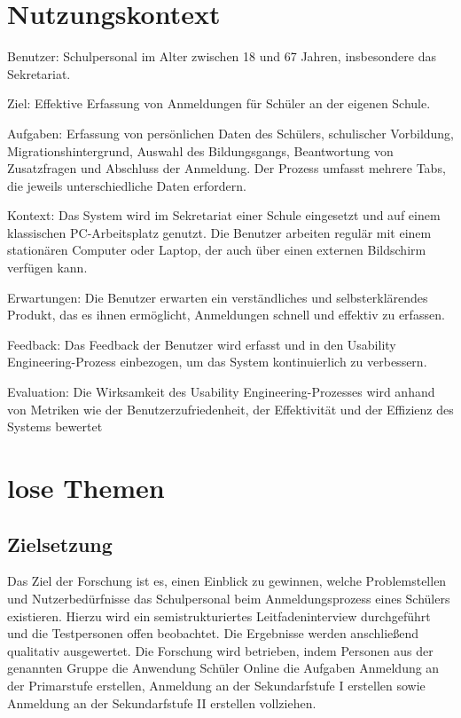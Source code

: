 
\section{Nutzungskontext}
Benutzer: Schulpersonal im Alter zwischen 18 und 67 Jahren, insbesondere das Sekretariat.

Ziel: Effektive Erfassung von Anmeldungen für Schüler an der eigenen Schule.

Aufgaben: Erfassung von persönlichen Daten des Schülers, schulischer Vorbildung, Migrationshintergrund, Auswahl des Bildungsgangs, Beantwortung von Zusatzfragen und Abschluss der Anmeldung. Der Prozess umfasst mehrere Tabs, die jeweils unterschiedliche Daten erfordern.

Kontext: Das System wird im Sekretariat einer Schule eingesetzt und auf einem klassischen PC-Arbeitsplatz genutzt. Die Benutzer arbeiten regulär mit einem stationären Computer oder Laptop, der auch über einen externen Bildschirm verfügen kann.

Erwartungen: Die Benutzer erwarten ein verständliches und selbsterklärendes Produkt, das es ihnen ermöglicht, Anmeldungen schnell und effektiv zu erfassen.

Feedback: Das Feedback der Benutzer wird erfasst und in den Usability Engineering-Prozess einbezogen, um das System kontinuierlich zu verbessern.

Evaluation: Die Wirksamkeit des Usability Engineering-Prozesses wird anhand von Metriken wie der Benutzerzufriedenheit, der Effektivität und der Effizienz des Systems bewertet

\section{lose Themen}
\subsection{Zielsetzung}
Das Ziel der Forschung ist es, einen Einblick zu gewinnen, welche Problemstellen und Nutzerbedürfnisse das Schulpersonal beim Anmeldungsprozess eines Schülers existieren. Hierzu wird ein semistrukturiertes Leitfadeninterview durchgeführt und die Testpersonen offen beobachtet. Die Ergebnisse werden anschließend qualitativ ausgewertet. Die Forschung wird betrieben, indem Personen aus der genannten Gruppe die Anwendung Schüler Online die Aufgaben \glqq Anmeldung an der Primarstufe erstellen\grqq{}, \glqq Anmeldung an der Sekundarfstufe I erstellen\grqq{} sowie \glqq Anmeldung an der Sekundarfstufe II erstellen\grqq{} vollziehen. 


